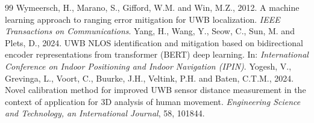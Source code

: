 \documentclass[11pt,a4paper]{article}
\begin{document}
\begin{thebibliography}{99}
 Wymeersch, H., Marano, S., Gifford, W.M. and Win, M.Z., 2012. A machine learning approach to ranging error mitigation for UWB localization. \emph{IEEE Transactions on Communications}.
 Yang, H., Wang, Y., Seow, C., Sun, M. and Plets, D., 2024. UWB NLOS identification and mitigation based on bidirectional encoder representations from transformer (BERT) deep learning. In: \emph{International Conference on Indoor Positioning and Indoor Navigation (IPIN)}.
 Yogesh, V., Grevinga, L., Voort, C., Buurke, J.H., Veltink, P.H. and Baten, C.T.M., 2024. Novel calibration method for improved UWB sensor distance measurement in the context of application for 3D analysis of human movement. \emph{Engineering Science and Technology, an International Journal}, 58, 101844.
\end{thebibliography}
\end{document}
